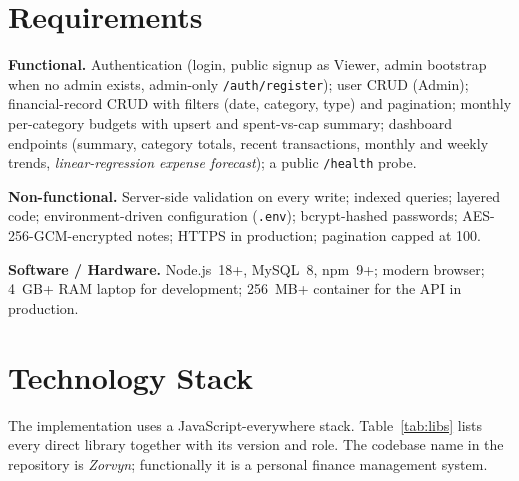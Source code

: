 \documentclass[11pt,a4paper]{article}
\newcommand{\code}[1]{\texttt{\small #1}}
\begin{document}
\section{Requirements}
\textbf{Functional.} Authentication (login, public signup as Viewer,
admin bootstrap when no admin exists, admin-only \code{/auth/register});
user CRUD (Admin); financial-record CRUD with filters (date, category,
type) and pagination; monthly per-category budgets with upsert and
spent-vs-cap summary; dashboard endpoints (summary, category totals,
recent transactions, monthly and weekly trends, \emph{linear-regression
expense forecast}); a public \code{/health} probe.

\textbf{Non-functional.} Server-side validation on every write;
indexed queries; layered code; environment-driven configuration
(\code{.env}); bcrypt-hashed passwords; AES-256-GCM-encrypted notes;
HTTPS in production; pagination capped at 100.

\textbf{Software / Hardware.} Node.js~18+, MySQL~8, npm~9+; modern
browser; 4~GB+ RAM laptop for development; 256~MB+ container for the
API in production.

\section{Technology Stack}
The implementation uses a JavaScript-everywhere stack. Table~\ref{tab:libs}
lists every direct library together with its version and role. The
codebase name in the repository is \textit{Zorvyn}; functionally it is
a personal finance management system.
\end{document}
